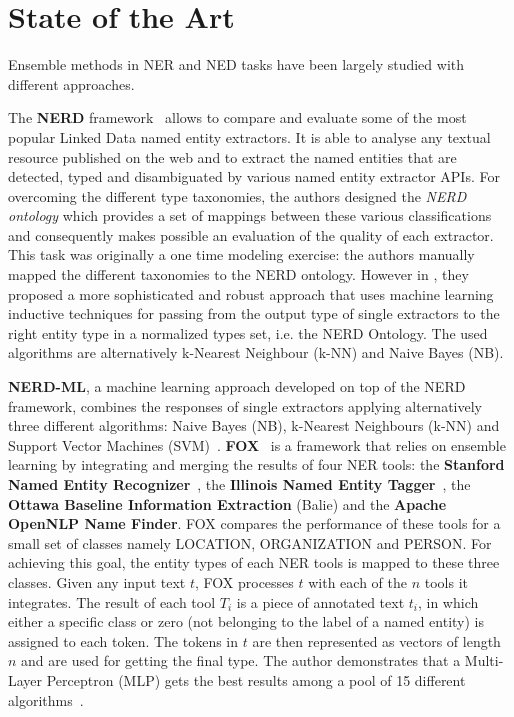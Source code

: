 \documentclass{llncs}
\begin{document}

\section{State of the Art}
\label{sec:state-of-art}
Ensemble methods in NER and NED tasks have been largely studied with different approaches.

The \textbf{NERD} framework~\cite{nerd1,nerd2} allows to compare and evaluate some of the most popular Linked Data named entity extractors.
It is able to analyse any textual resource published on the web and to extract the named entities that are detected, typed and disambiguated by various named entity extractor APIs. For overcoming the different type taxonomies, the authors designed the \textit{NERD ontology} which provides a set of mappings between these various classifications and consequently makes possible an evaluation of the quality of each extractor. This task was originally a one time modeling exercise: the authors manually mapped the different taxonomies to the NERD ontology.
However in \cite{nerd4}, they proposed a more sophisticated and robust approach that uses machine learning inductive techniques for passing from the output type of single extractors to the right entity type in a normalized types set, i.e. the NERD Ontology. The used algorithms are alternatively k-Nearest Neighbour (k-NN) and Naive Bayes (NB).

\textbf{NERD-ML}, a machine learning approach developed on top of the NERD framework, combines the responses of single extractors applying alternatively three different  algorithms: Naive Bayes (NB), k-Nearest Neighbours (k-NN) and Support Vector Machines (SVM)~\cite{nerd2,nerd3}. \textbf{FOX}~\cite{fox1,fox2} is a framework that relies on ensemble learning by integrating and merging the results of four NER tools: the \textbf{Stanford Named Entity Recognizer}~\cite{Finkel:2005:INI:1219840.1219885},
the \textbf{Illinois Named Entity Tagger}~\cite{Ratinov:2009:DCM:1596374.1596399},
the \textbf{Ottawa Baseline Information Extraction} (Balie) and the \textbf{Apache OpenNLP Name Finder}. FOX compares the performance of these tools for a small set of classes namely LOCATION, ORGANIZATION and PERSON. For achieving this goal, the entity types of each NER tools is mapped to these three classes. Given any input text $t$, FOX processes $t$ with each of the $n$ tools it integrates. The result of each tool $T_i$ is a piece of annotated text $t_i$, in which either a specific class or zero (not belonging to the label of a named entity) is assigned to each token. The tokens in $t$ are then represented as vectors of length $n$ and are used for getting the final type. The author demonstrates that a Multi-Layer Perceptron (MLP) gets the best results among a pool of 15 different algorithms~\cite{fox2}.
\end{document}
